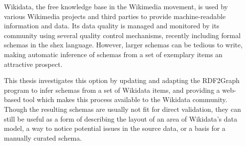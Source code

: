 
\Abstract
\Gls{Wikidata}, the free knowledge base in the \gls{Wikimedia} movement,
is used by various \gls{Wikimedia} projects and third parties to provide machine-readable information and data.
Its data quality is managed and monitored by its community using several quality control mechanisms,
recently including formal \glspl{schema} in the \acrlong{shex} language.
However, larger \glspl{schema} can be tedious to write,
making automatic inference of \glspl{schema} from a set of exemplary \glspl{item}
an attractive prospect.

This thesis investigates %
this option by updating and adapting the \gls{RDF2Graph} program
to infer \glspl{schema} from a set of \gls{Wikidata} \glspl{item},
and providing a web-based tool which makes this process available to the \gls{Wikidata} community.
Though the resulting \glspl{schema} are usually not fit for direct validation,
they can still be useful as a form of describing the layout of an area of \gls{Wikidata}’s data model,
a way to notice potential issues in the source data,
or a basis for a manually curated \gls{schema}.

